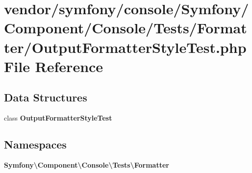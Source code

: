 \section{vendor/symfony/console/\+Symfony/\+Component/\+Console/\+Tests/\+Formatter/\+Output\+Formatter\+Style\+Test.php File Reference}
\label{_output_formatter_style_test_8php}
\subsection*{Data Structures}
\begin{DoxyCompactItemize}
\item 
class {\bf Output\+Formatter\+Style\+Test}
\end{DoxyCompactItemize}
\subsection*{Namespaces}
\begin{DoxyCompactItemize}
\item 
 {\bf Symfony\textbackslash{}\+Component\textbackslash{}\+Console\textbackslash{}\+Tests\textbackslash{}\+Formatter}
\end{DoxyCompactItemize}
